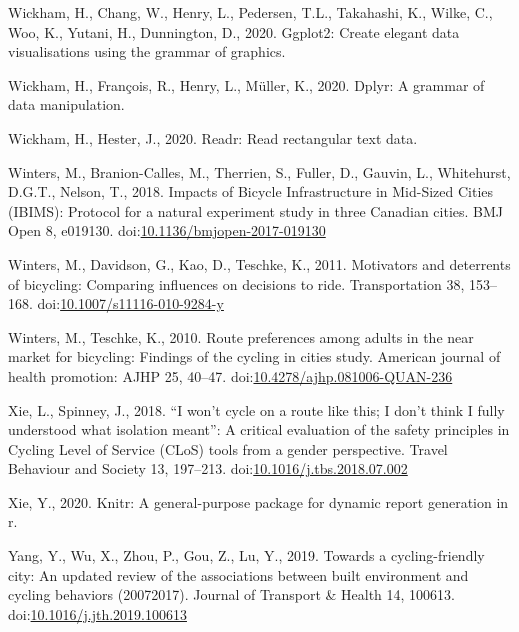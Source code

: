 \documentclass[]{elsarticle} %
\begin{document}
\leavevmode\hypertarget{ref-R-ggplot2}{}%
Wickham, H., Chang, W., Henry, L., Pedersen, T.L., Takahashi, K., Wilke,
C., Woo, K., Yutani, H., Dunnington, D., 2020. Ggplot2: Create elegant
data visualisations using the grammar of graphics.

\leavevmode\hypertarget{ref-R-dplyr}{}%
Wickham, H., François, R., Henry, L., Müller, K., 2020. Dplyr: A grammar
of data manipulation.

\leavevmode\hypertarget{ref-R-readr}{}%
Wickham, H., Hester, J., 2020. Readr: Read rectangular text data.

\leavevmode\hypertarget{ref-wintersImpactsBicycleInfrastructure2018}{}%
Winters, M., Branion-Calles, M., Therrien, S., Fuller, D., Gauvin, L.,
Whitehurst, D.G.T., Nelson, T., 2018. Impacts of Bicycle Infrastructure
in Mid-Sized Cities (IBIMS): Protocol for a natural experiment study in
three Canadian cities. BMJ Open 8, e019130.
doi:\href{https://doi.org/10.1136/bmjopen-2017-019130}{10.1136/bmjopen-2017-019130}

\leavevmode\hypertarget{ref-wintersMotivatorsDeterrentsBicycling2011}{}%
Winters, M., Davidson, G., Kao, D., Teschke, K., 2011. Motivators and
deterrents of bicycling: Comparing influences on decisions to ride.
Transportation 38, 153--168.
doi:\href{https://doi.org/10.1007/s11116-010-9284-y}{10.1007/s11116-010-9284-y}

\leavevmode\hypertarget{ref-wintersRoutePreferencesAdults2010}{}%
Winters, M., Teschke, K., 2010. Route preferences among adults in the
near market for bicycling: Findings of the cycling in cities study.
American journal of health promotion: AJHP 25, 40--47.
doi:\href{https://doi.org/10.4278/ajhp.081006-QUAN-236}{10.4278/ajhp.081006-QUAN-236}

\leavevmode\hypertarget{ref-xieWonCycleRoute2018}{}%
Xie, L., Spinney, J., 2018. ``I won't cycle on a route like this; I
don't think I fully understood what isolation meant'': A critical
evaluation of the safety principles in Cycling Level of Service (CLoS)
tools from a gender perspective. Travel Behaviour and Society 13,
197--213.
doi:\href{https://doi.org/10.1016/j.tbs.2018.07.002}{10.1016/j.tbs.2018.07.002}

\leavevmode\hypertarget{ref-R-knitr}{}%
Xie, Y., 2020. Knitr: A general-purpose package for dynamic report
generation in r.

\leavevmode\hypertarget{ref-yangCyclingfriendlyCityUpdated2019}{}%
Yang, Y., Wu, X., Zhou, P., Gou, Z., Lu, Y., 2019. Towards a
cycling-friendly city: An updated review of the associations between
built environment and cycling behaviors (20072017). Journal of Transport
\& Health 14, 100613.
doi:\href{https://doi.org/10.1016/j.jth.2019.100613}{10.1016/j.jth.2019.100613}
\end{document}
